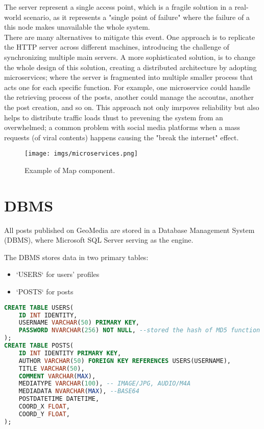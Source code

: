 \documentclass[conference]{IEEEtran}
\begin{document}
The server represent a single access point, which is a fragile solution in a real-world scenario, as it represents a "single point of failure" where the failure of a this node makes unavailable the whole system.
\\
There are many alternatives to mitigate this event. One approach is to replicate the HTTP server across different machines, introducing the challenge of synchronizing multiple main servers.
A more sophisticated solution, is to change the whole design of this solution, creating a distributed architecture by adopting microservices\cite{b6}; where the server is fragmented into multiple smaller process that acts one for each specific function.
For example, one microservice could handle the retrieving process of the posts, another could manage the accoutns, another the post creation, and so on. This approach not only imrpoves reliability but also helps to distribute traffic loads thust to prevening the system from an overwhelmed; a common problem with social media platforms when a mass requests (of viral contents) happens causing the "break the internet" effect.


\begin{figure}[htbp]
\begin{center}
{\texttt{[image: imgs/microservices.png]}}
\end{center}
\caption{Example of Map component.}
\label{fig}
\end{figure}

\section{DBMS}

All posts published on GeoMedia are stored in a Database Management System (DBMS), where Microsoft SQL Server\cite{b7} serving as the engine.

The DBMS stores data in two primary tables:

\begin{itemize}
    \item `USERS` for users' profiles
    \item `POSTS` for posts 
\end{itemize}

\begin{lstlisting}[language=SQL, description=Creation of tables]
CREATE TABLE USERS(
    ID INT IDENTITY,
    USERNAME VARCHAR(50) PRIMARY KEY,
    PASSWORD NVARCHAR(256) NOT NULL, --stored the hash of MD5 function
);
CREATE TABLE POSTS(
	ID INT IDENTITY PRIMARY KEY,
	AUTHOR VARCHAR(50) FOREIGN KEY REFERENCES USERS(USERNAME),
	TITLE VARCHAR(50),
	COMMENT VARCHAR(MAX),
	MEDIATYPE VARCHAR(100), -- IMAGE/JPG, AUDIO/M4A
	MEDIADATA NVARCHAR(MAX), --BASE64
	POSTDATETIME DATETIME,
	COORD_X FLOAT,
	COORD_Y FLOAT,
);
\end{lstlisting}
\end{document}
